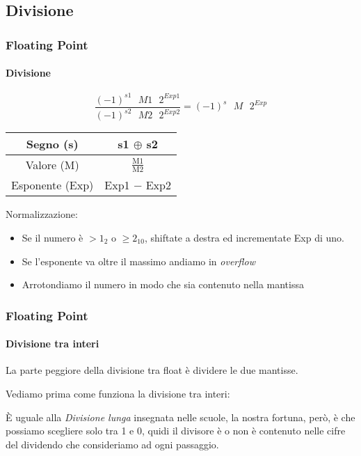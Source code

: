 \documentclass{beamer}
\begin{document}
	\subsection{Divisione}
  \begin{frame}
    \frametitle{Floating Point}
    \framesubtitle{Divisione}       
    
    $$\frac{(-1)^{s1} \text{ } M1 \text{ } 2^{Exp1}}{(-1)^{s2} \text{ } M2 \text{ } 2^{Exp2}}= (-1)^{s} \text{ } M \text{ } 2^{Exp}$$
  	
  		\begin{center}
  			\begin{tabular}{|cc|}
  			\hline 
  			Segno (s) & s1 $\oplus$ s2 \\ 
  			\hline 
  			Valore (M) & $\frac{\text{M1}}{\text{M2}}$ \\ 
  			\hline 
  			Esponente (Exp) & Exp1 $-$ Exp2 \\ 
  			\hline 
  			\end{tabular} 
  		\end{center}
	  
	  \vspace{1em}
	  
	  Normalizzazione:
	  \begin{itemize}
	  		\item Se il numero è $> 1_{2}$ o $\geq 2_{10}$, shiftate a destra ed incrementate Exp di uno.
	  		\item Se l'esponente va oltre il massimo andiamo in \emph{overflow}
	  		\item Arrotondiamo il numero in modo che sia contenuto nella mantissa
	  \end{itemize}
  \end{frame}	  
  
  \begin{frame}
    \frametitle{Floating Point}
    \framesubtitle{Divisione tra interi}
    La parte peggiore della divisione tra float è dividere le due mantisse.
		
		\vspace{1em}
		    
    Vediamo prima come funziona la divisione tra interi:

		\vspace{1em}
		
		È uguale alla \emph{Divisione lunga} insegnata nelle scuole, la nostra
		fortuna, però, è che possiamo scegliere solo tra 1 e 0, quidi il divisore
		è o non è contenuto nelle cifre del dividendo che consideriamo ad ogni passaggio.
  \end{frame}
  
\end{document}
